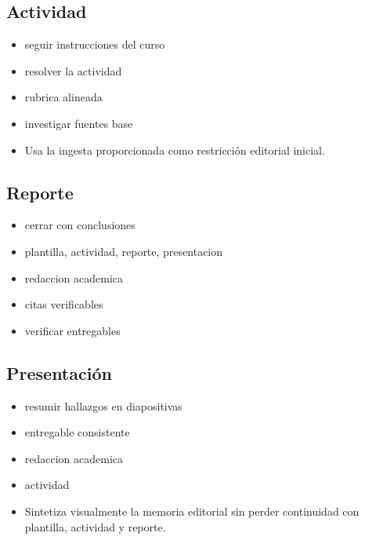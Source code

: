 \documentclass[12pt]{article}
\begin{document}
\subsection*{Actividad}
\begin{itemize}[leftmargin=*]
  \item seguir instrucciones del curso
  \item resolver la actividad
  \item rubrica alineada
  \item investigar fuentes base
  \item Usa la ingesta proporcionada como restricción editorial inicial.
\end{itemize}

\subsection*{Reporte}
\begin{itemize}[leftmargin=*]
  \item cerrar con conclusiones
  \item plantilla, actividad, reporte, presentacion
  \item redaccion academica
  \item citas verificables
  \item verificar entregables
\end{itemize}

\subsection*{Presentación}
\begin{itemize}[leftmargin=*]
  \item resumir hallazgos en diapositivas
  \item entregable consistente
  \item redaccion academica
  \item actividad
  \item Sintetiza visualmente la memoria editorial sin perder continuidad con plantilla, actividad y reporte.
\end{itemize}
\end{document}
